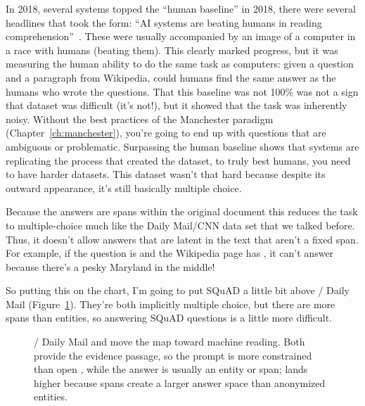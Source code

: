 In 2018, several systems topped the ``human baseline'' in 2018, there
were several headlines that took the form: ``AI systems are beating
humans in reading comprehension''~\citep{najberg-18,cuthbertson-18}.
%
These were usually accompanied by an image of a computer in a race
with humans (beating them).
%
This clearly marked progress, but it was measuring the human ability
to do the same task as computers: given a question and a paragraph
from Wikipedia, could humans find the same answer as the humans who
wrote the questions.
%
That this baseline was not 100\% was not a sign that \squad{} dataset
was difficult (it's not!), but it showed that the task was inherently
noisy.
%
Without the best practices of the Manchester paradigm
(Chapter~\ref{ch:manchester}), you're going to end up with questions
that are ambiguous or problematic.
%
Surpassing the human baseline shows that systems are replicating the
process that created the dataset, to truly best humans, you need to
have harder datasets.
%
This dataset wasn't that hard because despite its outward appearance,
it's still basically multiple choice.

Because the answers are spans within the original document this
reduces the task to multiple-choice much like the Daily Mail/CNN data
set that we talked before.
%
Thus, it doesn't allow answers that are latent in the text that aren’t
a fixed span.
%
For example, if the question is  and the Wikipedia page has
, it can’t answer  because
there’s a pesky Maryland in the middle!

So putting this on the chart, I’m going to put SQuAD a little bit
above  / Daily Mail (Figure~\ref{fig:datasets-plot-squad}).
%
They’re both implicitly multiple choice, but there are more spans than
entities, so answering SQuAD questions is a little more difficult.

\begin{figure}
\centering
{}
\caption{ / Daily Mail and \squad{} move the map toward
  machine reading.  Both provide the evidence passage, so the prompt is
  more constrained than open \trecqa{}, while the answer is usually an
  entity or span; \squad{} lands higher because spans create a larger
  answer space than anonymized entities.}
\label{fig:datasets-plot-squad}
\end{figure}

